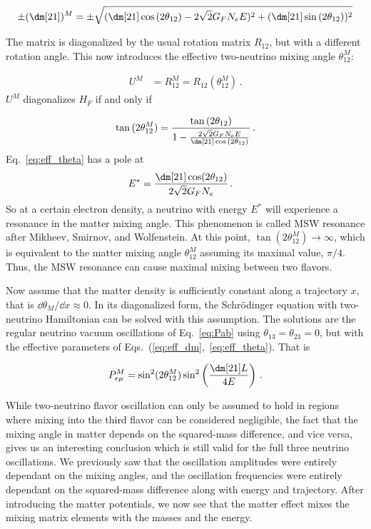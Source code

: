 \begin{align}\label{eq:eff_dm}
    \pm (\dm[21])^M = \pm \sqrt{(\dm[21] \cos{(2\theta_{12}) - 2\sqrt{2}G_F N_e E})^2 + (\dm[21]\sin{(2\theta_{12})})^2}
\end{align}

The matrix is diagonalized by the usual rotation matrix $R_{12}$, but with a different rotation angle. This now introduces the effective two-neutrino mixing angle $\theta_{12}^M$:

\begin{align}
    U^M &= R_{12}^M = R_{12}(\theta_{12}^M)\,.
\end{align}
$U^M$ diagonalizes $H_F$ if and only if 

\begin{align}\label{eq:eff_theta}
    \tan{(2\theta_{12}^M)} = \frac{\tan{(2\theta_{12})}}{1- \frac{2\sqrt{2}G_F N_e E}{\dm[21]\cos{(2\theta_{12})}}}\,.
\end{align}
Eq.~\ref{eq:eff_theta} has a pole at
\begin{align}\label{eq:MSW}
    E^* &= \frac{\dm[21]\cos(2\theta_{12})}{2\sqrt{2}G_F N_e}\,.
\end{align}
So at a certain electron density, a neutrino with energy $E^*$ will experience a resonance in the matter mixing angle. This phenomenon is called MSW resonance after Mikheev, Smirnov, and Wolfenstein. At this point, $\tan{(2\theta_{12}^M)} \to \infty$, which is equivalent to the matter mixing angle $\theta_{12}^M$ assuming its maximal value, $\pi/4$. Thus, the MSW resonance can cause maximal mixing between two flavors. 

Now assume that the matter density is sufficiently constant along a trajectory $x$, that is $\dd \theta_M / \dd x \approx 0$.
In its diagonalized form, the Schrödinger equation with two-neutrino Hamiltonian can be solved with this assumption. 
The solutions are the regular neutrino vacuum oscillations of Eq.~\ref{eq:Pab} using $\theta_{13} = \theta_{23} =0$, but with the effective parameters of Eqs.~(\ref{eq:eff_dm},~\ref{eq:eff_theta}). That is

\begin{align}\label{eq:2gen}
    P_{e\mu}^M = \sin^2(2\theta_{12}^M)\sin^2\left(\frac{\dm[21]L}{4E}\right)\,.
\end{align}

While two-neutrino flavor oscillation can only be assumed to hold in regions where mixing into the third flavor can be considered negligible,
the fact that the mixing angle in matter depends on the squared-mass difference, and vice versa, gives us an interesting conclusion which is 
still valid for the full three neutrino oscillations. We previously saw that the oscillation amplitudes were entirely dependant on
the mixing angles, and the oscillation frequencies were entirely dependant on the squared-mass difference along with energy and trajectory. After 
introducing the matter potentials, we now see that the matter effect mixes the mixing matrix elements with the masses and the energy.

